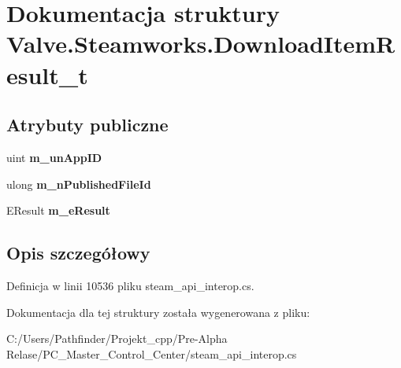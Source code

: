 \hypertarget{struct_valve_1_1_steamworks_1_1_download_item_result__t}{}\section{Dokumentacja struktury Valve.\+Steamworks.\+Download\+Item\+Result\+\_\+t}
\label{struct_valve_1_1_steamworks_1_1_download_item_result__t}
\subsection*{Atrybuty publiczne}
\begin{DoxyCompactItemize}
\item 
\mbox{\label{struct_valve_1_1_steamworks_1_1_download_item_result__t_ac7566f5a9605cc3a0d8baef137503602}} 
uint {\bfseries m\+\_\+un\+App\+ID}
\item 
\mbox{\label{struct_valve_1_1_steamworks_1_1_download_item_result__t_a5073dd72ff814bf083ef1c1c3e861e20}} 
ulong {\bfseries m\+\_\+n\+Published\+File\+Id}
\item 
\mbox{\label{struct_valve_1_1_steamworks_1_1_download_item_result__t_ae2cd9079cf50432931d72c4744650a74}} 
E\+Result {\bfseries m\+\_\+e\+Result}
\end{DoxyCompactItemize}


\subsection{Opis szczegółowy}


Definicja w linii 10536 pliku steam\+\_\+api\+\_\+interop.\+cs.



Dokumentacja dla tej struktury została wygenerowana z pliku\+:\begin{DoxyCompactItemize}
\item 
C\+:/\+Users/\+Pathfinder/\+Projekt\+\_\+cpp/\+Pre-\/\+Alpha Relase/\+P\+C\+\_\+\+Master\+\_\+\+Control\+\_\+\+Center/steam\+\_\+api\+\_\+interop.\+cs\end{DoxyCompactItemize}
